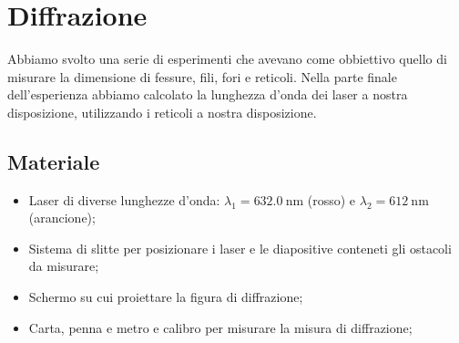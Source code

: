 \section{Diffrazione}

Abbiamo svolto una serie di esperimenti che avevano come obbiettivo quello di misurare la dimensione di fessure, fili,
fori e reticoli. Nella parte finale dell'esperienza abbiamo calcolato la lunghezza d'onda dei laser a nostra disposizione,
utilizzando i reticoli a nostra disposizione.

\subsection{Materiale}

\begin{itemize}
    \item{Laser di diverse lunghezze d'onda: $\lambda_1 = \SI{632.0}{\nano\metre}$ (rosso) e $\lambda_2 = \SI{612}{\nano\metre}$ (arancione);}
    \item{Sistema di slitte per posizionare i laser e le diapositive conteneti gli ostacoli da misurare;}
    \item{Schermo su cui proiettare la figura di diffrazione;}
    \item{Carta, penna e metro e calibro per misurare la misura di diffrazione;}
\end{itemize}
